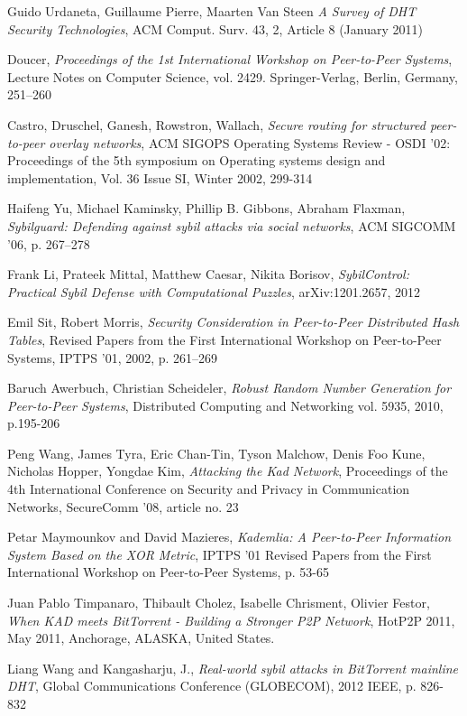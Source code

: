 \begin{thebibliography}{99}

 Guido Urdaneta, Guillaume Pierre, Maarten Van Steen
\textit{A Survey of DHT Security Technologies}, ACM Comput. Surv.  43, 2,
Article 8 (January 2011)

 Doucer, \textit{Proceedings of the 1st International
Workshop on Peer-to-Peer Systems}, Lecture Notes on Computer Science, vol. 2429.
Springer-Verlag, Berlin, Germany, 251–260

 Castro, Druschel, Ganesh, Rowstron, Wallach,
\textit{Secure routing for structured peer-to-peer overlay networks},
ACM SIGOPS Operating Systems Review - OSDI '02: Proceedings of the 5th symposium
on Operating systems design and implementation,
Vol. 36 Issue SI, Winter 2002,
299-314

Haifeng Yu, Michael Kaminsky, Phillip B. Gibbons, Abraham Flaxman,
\textit{Sybilguard: Defending against sybil attacks via social networks},
ACM SIGCOMM ’06, p. 267--278

Frank Li, Prateek Mittal, Matthew Caesar, Nikita Borisov,
\textit{SybilControl: Practical Sybil Defense with Computational Puzzles},
arXiv:1201.2657, 2012

Emil Sit, Robert Morris,
\textit{Security Consideration in Peer-to-Peer Distributed Hash Tables},
Revised Papers from the First International Workshop on Peer-to-Peer Systems,
IPTPS '01, 2002, p. 261--269

Baruch Awerbuch, Christian Scheideler,
\textit{Robust Random Number Generation for Peer-to-Peer Systems},
Distributed Computing and Networking vol. 5935, 2010, p.195-206

Peng Wang, James Tyra, Eric Chan-Tin, Tyson Malchow, Denis Foo Kune, Nicholas
Hopper, Yongdae Kim,
\textit{Attacking the Kad Network},
Proceedings of the 4th International Conference on Security and Privacy in
Communication Networks, SecureComm '08, article no. 23

Petar Maymounkov and David Mazieres,
\textit{Kademlia: A Peer-to-Peer Information System Based on the XOR Metric},
IPTPS '01 Revised Papers from the First International Workshop on Peer-to-Peer
Systems, p. 53-65

Juan Pablo Timpanaro, Thibault Cholez, Isabelle Chrisment, Olivier Festor,
\textit{When KAD meets BitTorrent - Building a Stronger P2P Network},
HotP2P 2011, May 2011, Anchorage, ALASKA, United States.

Liang Wang and Kangasharju, J.,
\textit{Real-world sybil attacks in BitTorrent mainline DHT},
Global Communications Conference (GLOBECOM), 2012 IEEE, p. 826-832

\end{thebibliography}
